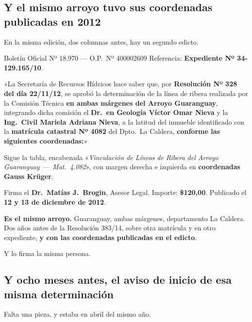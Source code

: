 \subsection*{Y el mismo arroyo tuvo sus coordenadas publicadas en 2012}

En la misma edición, dos columnas antes, hay un segundo edicto.

\begin{ficha}{Boletín Oficial Nº 18.970 --- O.P.\ Nº 400002609}
Referencia: \textbf{Expediente Nº 34-129.165/10}.

«La Secretaría de Recursos Hídricos hace saber que, por \textbf{Resolución Nº 328 del día
22/11/12}, se aprobó la determinación de la línea de ribera realizada por la Comisión Técnica
\textbf{en ambas márgenes del Arroyo Guaranguay}, integrando dicha comisión el \textbf{Dr.\ en
Geología Víctor Omar Nieva} y la \textbf{Ing.\ Civil Mariela Adriana Nieva}, a la latitud del
inmueble identificado con la \textbf{matrícula catastral Nº 4082} del Dpto.\ La Caldera,
\textbf{conforme las siguientes coordenadas:}»

Sigue la tabla, encabezada «\textit{Vinculación de Líneas de Ribera del Arroyo Guaranguay
---~Mat.\ 4.082}», con margen derecha e izquierda en \textbf{coordenadas Gauss Krüger}.

Firma el \textbf{Dr.\ Matías J.\ Brogin}, Asesor Legal. Importe: \textbf{\$120,00}. Publicado
el \textbf{12 y 13 de diciembre de 2012}.
\end{ficha}

\textbf{Es el mismo arroyo.} Guaranguay, ambas márgenes, departamento La Caldera. Dos años
antes de la Resolución 383/14, sobre otra matrícula y en otro expediente, \textbf{y con las
coordenadas publicadas en el edicto}.

Y lo firma la misma persona.

\subsection*{Y ocho meses antes, el aviso de inicio de esa misma determinación}

Falta una pieza, y estaba en abril del mismo año.

